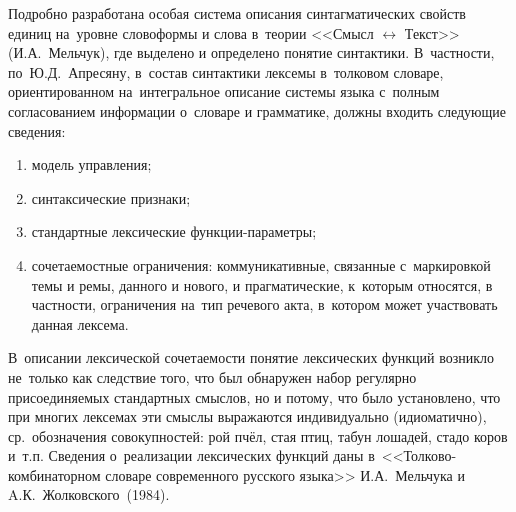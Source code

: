 \documentclass[12pt]{article}
\theoremstyle{definition}
\theoremstyle{remark}
\numberwithin{equation}{section}
\begin{document}
Подробно разработана особая система описания синтагматических
свойств единиц на~уровне словоформы и слова в~теории
<<Смысл $\leftrightarrow$ Текст>> (И.А.~Мельчук), где выделено
и определено понятие синтактики. В~частности, по~Ю.Д.~Апресяну,
в~состав синтактики лексемы в~толковом словаре, ориентированном
на~интегральное описание системы языка с~полным согласованием
информации о~словаре и грамматике, должны входить следующие сведения:
\begin{enumerate}
	\item модель управления;
	\item синтаксические признаки;
	\item стандартные лексические функции\nobreakdash-параметры;
	\item сочетаемостные ограничения: коммуникативные, связанные
    с~маркировкой темы и ремы, данного и нового, и прагматические,
    к~которым относятся, в частности, ограничения на~тип речевого
    акта, в~котором может участвовать данная лексема.
\end{enumerate}

В~описании лексической сочетаемости понятие лексических функций
возникло не~только как следствие того, что был обнаружен набор
регулярно присоединяемых стандартных смыслов, но и потому, что
было установлено, что при многих лексемах эти смыслы выражаются
индивидуально (идиоматично), ср.~обозначения совокупностей:
рой пчёл, стая птиц, табун лошадей, стадо коров и~т.п. Сведения
о~реализации лексических функций даны в~<<Толково-комбинаторном
словаре современного русского языка>> И.А.~Мельчука и
A.К.~Жолковского~(1984).
\end{document}
